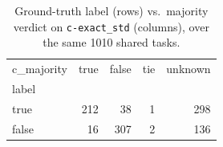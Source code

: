 \begin{table}[t]
  \centering
  \caption{Ground-truth label (rows) vs.\ majority verdict on \texttt{c-exact_std} (columns), over the same 1010 shared tasks.}
  \label{tab:label-majority-c-exact_std}
\begin{tabular}{lrrrr}
\toprule
c_majority & true & false & tie & unknown \\
label &  &  &  &  \\
\midrule
true & 212 & 38 & 1 & 298 \\
false & 16 & 307 & 2 & 136 \\
\bottomrule
\end{tabular}
\end{table}
